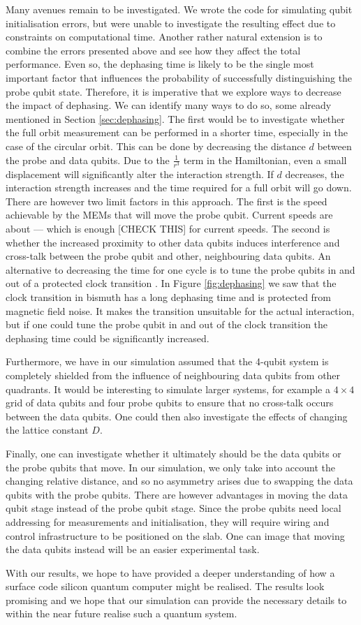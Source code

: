 Many avenues remain to be investigated. We wrote the code for simulating qubit initialisation errors, but were unable to investigate the resulting effect due to constraints on computational time. Another rather natural extension is to combine the errors presented above and see how they affect the total performance. Even so, the dephasing time is likely to be the single most important factor that influences the probability of successfully distinguishing the probe qubit state. Therefore, it is imperative that we explore ways to decrease the impact of dephasing. We can identify many ways to do so, some already mentioned in Section \ref{sec:dephasing}. The first would be to investigate whether the full orbit measurement can be performed in a shorter time, especially in the case of the circular orbit. This can be done by decreasing the distance $d$ between the probe and data qubits. Due to the $\frac{1}{r^3}$ term in the Hamiltonian, even a small displacement will significantly alter the interaction strength. If $d$ decreases, the interaction strength increases and the time required for a full orbit will go down. There are however two limit factors in this approach. The first is the speed achievable by the MEMs that will move the probe qubit. Current speeds are about --- \cite{something} which is enough [CHECK THIS] for current speeds. The second is whether the increased proximity to other data qubits induces interference and cross-talk between the probe qubit and other, neighbouring data qubits. 
 An alternative to decreasing the time for one cycle is to tune the probe qubits in and out of a protected clock transition \cite{something}. In Figure \ref{fig:dephasing} we saw that the clock transition in bismuth has a long dephasing time and is protected from magnetic field noise. It makes the transition unsuitable for the actual interaction, but if one could tune the probe qubit in and out of the clock transition the dephasing time could be significantly increased. 

Furthermore, we have in our simulation assumed that the 4-qubit system is completely shielded from the influence of neighbouring data qubits from other quadrants. It would be interesting to simulate larger systems, for example a $4\times 4$ grid of data qubits and four probe qubits to ensure that no cross-talk occurs between the data qubits. One could then also investigate the effects of changing the lattice constant $D$. 

Finally, one can investigate whether it ultimately should be the data qubits or the probe qubits that  move. In our simulation, we only take into account the changing relative distance, and so no asymmetry arises due to swapping the data qubits with the probe qubits. There are however advantages in moving the data qubit stage instead of the probe qubit stage. Since the probe qubits need local addressing for measurements and initialisation, they will require wiring and control infrastructure to be positioned on the slab. One can image that moving the data qubits instead will be an easier experimental task. 

With our results, we hope to have provided a deeper understanding of how a surface code silicon quantum computer might be realised. The results look promising and we hope that our simulation can provide the necessary details to within the near future realise such a quantum system. 